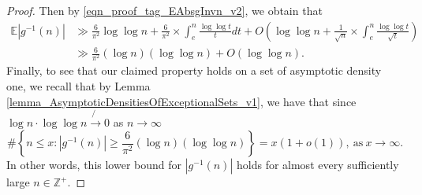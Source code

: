 \documentclass[11pt,reqno,a4letter]{article}
\numberwithin{figure}{section}
\numberwithin{table}{section}
\theoremstyle{plain}
\numberwithin{theorem}{section}
\theoremstyle{definition}
\begin{document}
\begin{proof}
Then by \eqref{eqn_proof_tag_EAbsgInvn_v2}, we obtain that 
\begin{align*} 
\mathbb{E}|g^{-1}(n)| & \gg \frac{6}{\pi^2} \log\log n + \frac{6}{\pi^2} \times \int_{e}^{n} 
     \frac{\log\log t}{t} dt + 
     O\left(\log\log n + \frac{1}{\sqrt{n}} \times \int_{e}^{n} \frac{\log\log t}{\sqrt{t}}\right) \\ 
     & \gg \frac{6}{\pi^2} (\log n) (\log\log n) + O(\log\log n). 
\end{align*} 
Finally, to see that our claimed property 
holds on a set of asymptotic density one, we recall that by 
Lemma \ref{lemma_AsymptoticDensitiesOfExceptionalSets_v1}, 
we have that since $\log n \cdot \log\log n \not{\rightarrow} 0$ as $n \rightarrow \infty$ 
\begin{equation} 
\label{eqn_proof_tag_DensityOfgInvnNearExpectation_v3} 
\#\left\{n \leq x: |g^{-1}(n)| \geq \frac{6}{\pi^2} (\log n) (\log\log n)\right\} = 
     x(1 + o(1)), \mathrm{\ as\ } x \rightarrow \infty. 
\end{equation} 
In other words, this lower bound for $|g^{-1}(n)|$ holds for almost every 
sufficiently large $n \in \mathbb{Z}^{+}$. 
\end{proof} 
\end{document}
